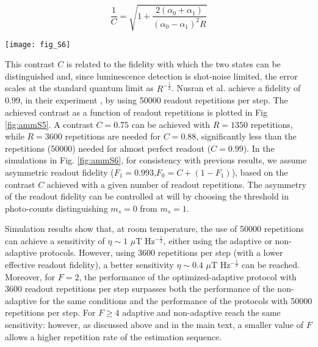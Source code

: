 \begin{equation}
\frac{1}{C} = \sqrt{1+\frac{2(\alpha_0 + \alpha_1)}{(\alpha_0-\alpha_1)^2R}}
\end{equation}

\begin{figure*}
	\centering
	\texttt{[image: fig\_S6]}
	\caption{\label{fig:ammS6} \textbf{Adaptive protocol for room-temperature} Simulations comparing the minimum magnetic field sensitivity (in nT Hz$^{-\frac{1}{2}}$) for the optimized adaptive and the non-adaptive protocols at room-temperature and low-temperature ($T_2^* = 96 \mu$s, $N = 10$, $G = 5$). 
	}
\end{figure*}
This contrast $C$ is related to the fidelity with which the two states can be distinguished and, since luminescence detection is shot-noise limited, the error scales at the standard quantum limit as $R^{-\frac{1}{2}}$. Nusran et al. achieve a fidelity of 0.99, in their experiment \cite{Nusran_NatNano_2012}, by using 50000 readout repetitions per step. The achieved contrast as a function of readout repetitions is plotted in Fig \ref{fig:ammS5}.
A contrast $C = 0.75$ can be achieved with $R = 1350$ repetitions, while $R = 3600$ repetitions are needed for $C = 0.88$, significantly less than the repetitions (50000) needed for almost perfect readout ($C = 0.99$). 
In the simulations in Fig. \ref{fig:ammS6}, for consistency with previous results, we assume asymmetric readout fidelity ($F_1 = 0.993$,$F_0 = C+(1-F_1)$), based on the contrast $C$ achieved with a given number of readout repetitions. The asymmetry of the readout fidelity can be controlled at will by choosing the threshold in photo-counts distinguishing $m_s = 0$ from $m_s = 1$.

Simulation results show that, at room temperature, the use of 50000 repetitions can achieve a sensitivity of $\eta \sim 1$ $\mu$T Hz$^{-\frac{1}{2}}$, either using the adaptive or non-adaptive protocols. However, using 3600 repetitions per step (with a lower effective readout fidelity), a better sensitivity $\eta \sim 0.4$ $\mu$T Hz$^{-\frac{1}{2}}$ can be reached. Moreover, for $F = 2$, the performance of the optimized-adaptive protocol with 3600 readout repetitions per step surpasses both the performance of the non-adaptive for the same conditions and the performance of the protocols with 50000 repetitions per step. For $F \geq 4$ adaptive and non-adaptive reach the same sensitivity: however, as discussed above and in the main text, a smaller value of $F$ allows a higher repetition rate of the estimation sequence.

